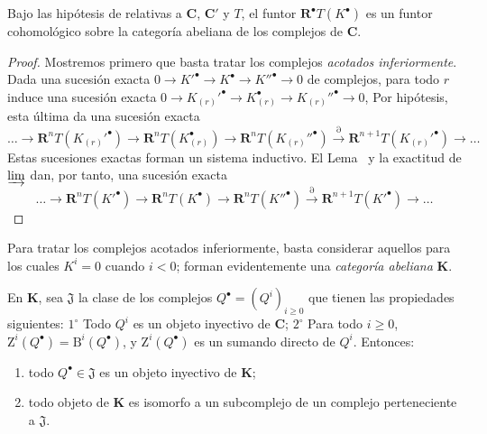 \begin{proposition}[11.5.2]
\label{0.11.5.2}
\label{0.11.5.2-fr}
Bajo las hipótesis de \textup{} relativas a $\boldsymbol{C}$, $\boldsymbol{C}'$ y $T$, el funtor $\mathbf R^\bullet T(K^\bullet)$ es un funtor cohomológico sobre la categoría abeliana de los complejos de $\boldsymbol{C}$.
\end{proposition}

\begin{proof}
Mostremos primero que basta tratar los complejos \emph{acotados inferiormente}.
Dada una sucesión exacta
$0\longrightarrow K'^\bullet\longrightarrow K^\bullet\longrightarrow K''^\bullet\longrightarrow0$
de complejos, para todo $r$ induce una sucesión exacta
$0\longrightarrow K_{(r)}'^\bullet\longrightarrow K_{(r)}^\bullet\longrightarrow K_{(r)}''^\bullet\longrightarrow0$,
Por hipótesis, esta última da una sucesión exacta
\[
  \ldots\longrightarrow\mathbf R^nT(K_{(r)}'^\bullet)
  \longrightarrow\mathbf R^nT(K_{(r)}^\bullet)
  \longrightarrow\mathbf R^nT(K_{(r)}''^\bullet)
  \xrightarrow{\partial}\mathbf R^{n+1}T(K_{(r)}'^\bullet)
  \longrightarrow\ldots
\]
Estas sucesiones exactas forman un sistema inductivo.
El Lema~ y la exactitud de $\varinjlim$ dan, por tanto, una sucesión exacta
\[
  \ldots\longrightarrow\mathbf R^nT(K'^\bullet)
  \longrightarrow\mathbf R^nT(K^\bullet)
  \longrightarrow\mathbf R^nT(K''^\bullet)
  \xrightarrow{\partial}\mathbf R^{n+1}T(K'^\bullet)
  \longrightarrow\ldots
\]
\end{proof}

Para tratar los complejos acotados inferiormente, basta considerar aquellos para los cuales $K^i=0$ cuando $i<0$; forman evidentemente una \emph{categoría abeliana} $\boldsymbol{K}$.

\begin{lemma}[11.5.2.1]
\label{0.11.5.2.1}
\label{0.11.5.2.1-fr}
En $\boldsymbol{K}$, sea $\mathfrak J$ la clase de los complejos $Q^\bullet=(Q^i)_{i\geq0}$ que tienen las
propiedades siguientes: $1^\circ$ Todo $Q^i$ es un objeto inyectivo de $\boldsymbol{C}$; $2^\circ$ Para todo $i\geq0$, $\mathrm Z^i(Q^\bullet)=\mathrm B^i(Q^\bullet)$, y $\mathrm Z^i(Q^\bullet)$ es un sumando directo de $Q^i$.
Entonces:
\begin{enumerate}
  \item[{\rm(i)}] todo $Q^\bullet\in\mathfrak J$ es un objeto inyectivo de $\boldsymbol{K}$;
  \item[{\rm(ii)}] todo objeto de $\boldsymbol{K}$ es isomorfo a un subcomplejo de un complejo perteneciente a $\mathfrak J$.
\end{enumerate}
\end{lemma}

